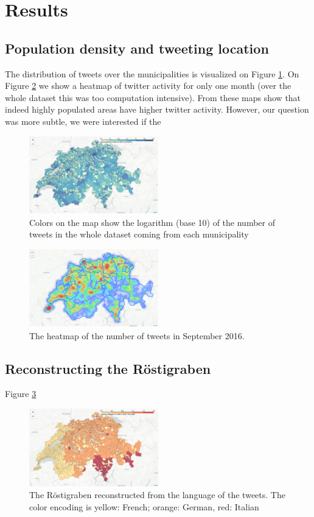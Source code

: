 \section{Results}

\subsection{Population density and tweeting location}

The distribution of tweets over the municipalities is visualized on Figure \ref{all_tweet_map}. On Figure \ref{heat_map} we show a heatmap of twitter activity for only one month (over the whole dataset this was too computation intensive). From these maps show that indeed highly populated areas have higher twitter activity. However, our question was more subtle, we were interested if the 


\begin{figure}[h]
  \includegraphics[width=0.5\textwidth]{images/all_tweet_map.png}
  \caption{Colors on the map show the logarithm (base 10) of the number of tweets in the whole dataset coming from each municipality}
  \label{all_tweet_map}
\end{figure}



\begin{figure}[h]
  \includegraphics[width=0.5\textwidth]{images/heat_map.png}
  \caption{The heatmap of the number of tweets in September 2016.}
  \label{heat_map}
\end{figure}


\subsection{Reconstructing the R\"ostigraben}
Figure \ref{rosti_map}

\begin{figure}[h]
  \includegraphics[width=0.5\textwidth]{images/rosti_map.png}
  \caption{The R\"ostigraben reconstructed from the language of the tweets. The color encoding is yellow: French; orange: German, red: Italian}
  \label{rosti_map}
\end{figure}


 

